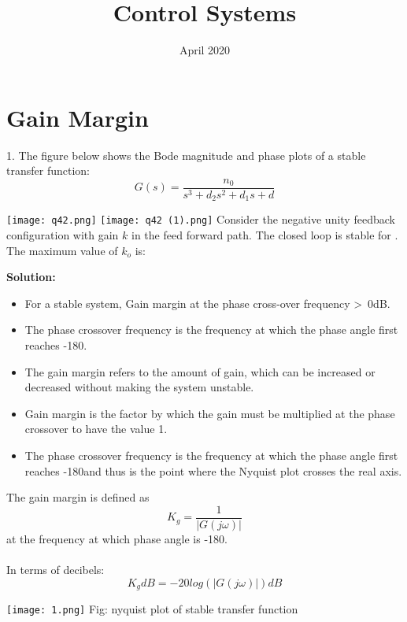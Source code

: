\documentclass[journal,12pt,twocolumn]{IEEEtran}
\title{Control Systems}
\author{  }
\date{April 2020}
\begin{document}
\maketitle
\tableofcontents
\section{Gain Margin}

1. The figure below shows the Bode magnitude and phase plots of a stable transfer function:
\begin{equation}  
            G(s) = \frac{n_0}{s^3 + d_2 s^2 + d_1 s + d}
\end{equation}
 
\texttt{[image: q42.png]}
\texttt{[image: q42 (1).png]}
 Consider the negative unity feedback configuration with gain $k$ in the feed forward path. The closed loop is stable for  . 
    The maximum value of $k_o$  is:


\noindent \textbf{ Solution:}
    \begin{itemize}
        \item For a stable system, Gain margin at the phase cross-over frequency \textgreater \ 0dB.
        \item The phase crossover frequency is the frequency at which the phase angle first reaches -180\degree.
        \item  The gain margin refers to the amount of gain, which can be increased or decreased without making the system unstable.
        \item Gain margin is the factor by which the gain must be multiplied at the phase crossover to have the value 1.
        \item The phase crossover frequency is the frequency at which the phase angle first reaches -180\degree and thus is the point where the Nyquist plot crosses the real axis.
    \end{itemize}

\noindent The gain margin is defined as
\begin{equation}
    K_g = \frac{1}{|G(j\omega)|}
\end{equation} 
at the frequency at which phase angle
is -180\degree.
\\\\ 
In terms of decibels: 
 \begin{equation}
    K_g dB = -20log(|G(j\omega)|) dB
\end{equation}

\texttt{[image: 1.png]}
Fig: nyquist plot of stable transfer function \\
\end{document}
